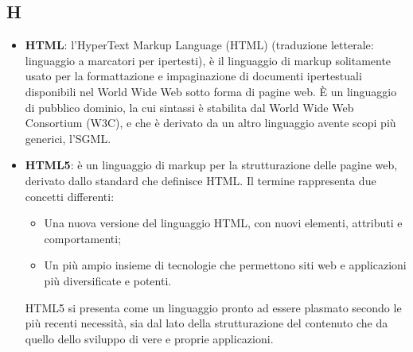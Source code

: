 \subsection{H}
\begin{itemize} 
	\item
	\textbf{HTML}: l'HyperText Markup Language (HTML) (traduzione letterale: linguaggio a marcatori per ipertesti), è il linguaggio di markup solitamente usato per la formattazione e impaginazione di documenti ipertestuali disponibili nel World Wide Web sotto forma di pagine web.
	È un linguaggio di pubblico dominio, la cui sintassi è stabilita dal World Wide Web Consortium (W3C), e che è derivato da un altro linguaggio avente scopi più generici, l'SGML. 
	\item
	\textbf{HTML5}: è un linguaggio di markup per la strutturazione delle pagine web, derivato dallo standard che definisce HTML.
	Il termine rappresenta due concetti differenti:
	\begin{itemize}
		\item
		Una nuova versione del linguaggio HTML, con nuovi elementi, attributi e comportamenti;
		\item
		Un più ampio insieme di tecnologie che permettono siti web e applicazioni più diversificate e potenti.
	\end{itemize}
	HTML5 si presenta come un linguaggio pronto ad essere plasmato secondo le più recenti necessità, sia dal lato della strutturazione del contenuto che da quello dello sviluppo di vere e proprie applicazioni.
\end{itemize}
